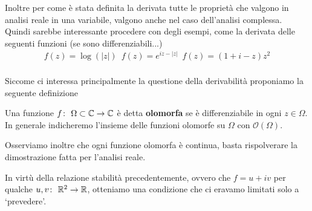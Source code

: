 Inoltre per come è stata definita la derivata tutte le proprietà che valgono in analisi reale in una variabile, valgono anche nel caso dell'analisi complessa. Quindi sarebbe interessante procedere con degli esempi, come la derivata delle seguenti funzioni (se sono differenziabili...)
\begin{equation}
\begin{aligned}
	f(z) = \log(|z|) \;\ f(z) = e^{iz - |z|} \;\ f(z) = (1 + i - z)z^2
\end{aligned}
\end{equation}
\\

Siccome ci interessa principalmente la questione della derivabilità proponiamo la seguente definizione

\begin{definition}
	Una funzione $f \colon\ \Omega \subset \mathbb{C} \rightarrow \mathbb{C}$ è detta \textbf{olomorfa} se è differenziabile in ogni $z \in \Omega$. In generale indicheremo l'insieme delle funzioni olomorfe su $\Omega$ con $\mathcal{O}(\Omega)$.
\end{definition}

\begin{remark}
	Osserviamo inoltre che ogni funzione olomorfa è continua, basta rispolverare la dimostrazione fatta per l'analisi reale.
\end{remark}

In virtù della relazione stabilità precedentemente, ovvero che $f = u + iv$ per qualche $u,v \colon\ \mathbb{R}^2 \rightarrow \mathbb{R}$, otteniamo una condizione che ci eravamo limitati solo a `prevedere'.

